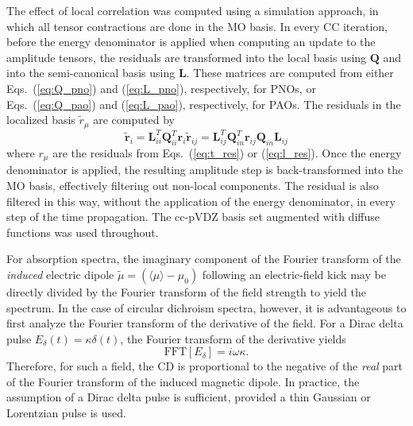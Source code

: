 The effect of local correlation was computed using a simulation approach,\cite{Hampel1996}
in which all tensor contractions are done in the MO basis. In every 
CC iteration, before the 
energy denominator is applied when computing an update to the amplitude tensors, the residuals
are transformed into the local basis using $\textbf{Q}$ and into the semi-canonical
basis using $\textbf{L}$. These matrices are computed from either Eqs.~(\ref{eq:Q_pno}) 
and (\ref{eq:L_pno}), respectively, for PNOs, or Eqs.~(\ref{eq:Q_pao}) and (\ref{eq:L_pao}),
respectively, for PAOs. The residuals in the localized basis $\tilde{r}_\mu$ are 
computed by
\begin{subequations} \label{eq:rotate}
\begin{equation} \label{eq:rotate_r1}
    \tilde{\textbf{r}}_i = \textbf{L}_{ii}^T\textbf{Q}_{ii}^T\textbf{r}_i
\end{equation}
\begin{equation} \label{eq:rotate_r2}
    \tilde{\textbf{r}}_{ij} = \textbf{L}_{ij}^T\textbf{Q}_{in}^T\textbf{r}_{ij}\textbf{Q}_{in}\textbf{L}_{ij}
\end{equation}
\end{subequations}
where $r_\mu$ are the residuals from Eqs.~(\ref{eq:t_res}) or (\ref{eq:l_res}). 
Once the energy denominator is applied, the resulting amplitude step is back-transformed
into the MO basis, effectively filtering out non-local components. 
The residual is also filtered in this way, without the
application of the energy denominator, in every step of the time propagation.
The cc-pVDZ basis
set augmented with diffuse functions\cite{Dunning1989,Woon1994} was used throughout.  

For absorption spectra, 
the imaginary component of the Fourier transform of the \textit{induced} electric dipole 
$\tilde{\mu} = (\langle\mu\rangle - \mu_0)$ following an electric-field kick 
may be directly divided by the Fourier transform of the field strength to yield the spectrum. 
In the case of circular dichroism spectra, however, it is advantageous to first 
analyze the Fourier transform of the derivative of the field. 
For a Dirac delta pulse $E_\delta(t) = \kappa\delta(t)$, 
the Fourier transform of the derivative yields
\begin{equation}
    \textrm{FFT}[E_\delta] = i\omega\kappa.
\end{equation}
Therefore, for such a field, the CD is proportional to the negative of the 
\textit{real} part of the Fourier 
transform of the induced magnetic dipole. 
In practice, the assumption of a Dirac delta pulse is sufficient, provided
a thin Gaussian or Lorentzian pulse is used. 

